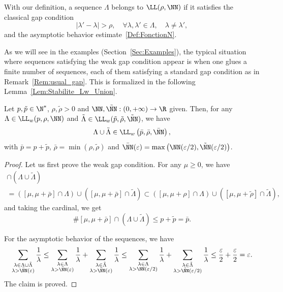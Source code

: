 \begin{rema}\label{Rem:usual_gap}
With our definition, a sequence $\Lambda$ belongs to $\LL(\rho,\NN)$ if it satisfies the classical gap condition
\begin{equation}\label{FattoriniRussell_Gap}
|\lambda' - \lambda| > \rho, \quad \forall \lambda,\lambda'\in \Lambda, \quad \lambda\neq \lambda',
\end{equation}
and the asymptotic behavior estimate~\eqref{Def:FonctionN}.
\end{rema}

As we will see in the examples (Section~\ref{Sec:Examples}), the typical situation where sequences satisfying the weak gap condition appear is when one glues a finite number of sequences, each of them satisfying a standard gap condition as in Remark~\ref{Rem:usual_gap}. This is formalized in the following Lemma~\ref{Lem:Stabilite_Lw_Union}.


\begin{lemm}\label{Lem:Stabilite_Lw_Union}
Let $p,\tilde{p} \in \N^*$, $\rho,\tilde{\rho} > 0$ and $\NN,\tilde{\NN} : (0,+\infty) \to \R$ given. Then, for any $\Lambda\in \LL_w(p, \rho, \NN)$ and $\tilde{\Lambda}\in \LL_w(\tilde{p}, \tilde{\rho}, \tilde{\NN})$, we have
\[
\Lambda \cup \tilde{\Lambda} \in \LL_w\left(\bar{p}, \bar{\rho}, \bar{\NN}\right),
\]
with $\bar{p}=p+\tilde{p}$, $\bar{\rho}=\min(\rho,\tilde{\rho})$ and $\bar{\NN}(\varepsilon) = \max \left(\NN(\varepsilon/2),\tilde{\NN}(\varepsilon/2)\right)$.
\end{lemm}

\begin{proof}
Let us first prove the weak gap condition. For any $\mu\geq 0$, we have
\begin{multline*}
[\mu,\mu+\bar{\rho}] \cap \left(\Lambda\cup \tilde{\Lambda}\right)\\ = \left([\mu,\mu+\bar{\rho}] \cap \Lambda \right) \cup \left([\mu,\mu+\bar{\rho}]\cap \tilde{\Lambda}\right)
\subset \left([\mu,\mu+\rho] \cap \Lambda \right) \cup \left([\mu,\mu+\tilde{\rho}]\cap \tilde{\Lambda}\right),
\end{multline*}
and taking the cardinal, we get
\[
\# [\mu,\mu+\bar{\rho}] \cap \left(\Lambda\cup \tilde{\Lambda}\right) \leq p + \tilde{p}=\bar{p}.
\]

For the asymptotic behavior of the sequences, we have
\[
\sum_{\substack{\lambda \in \Lambda\cup \tilde{\Lambda} \\ \lambda>\bar{\NN}(\varepsilon)}} \frac{1}{\lambda}
\leq \sum_{\substack{\lambda \in \Lambda \\ \lambda>\bar{\NN}(\varepsilon)}} \frac{1}{\lambda} + \sum_{\substack{\lambda \in \tilde{\Lambda} \\ \lambda>\bar{\NN}(\varepsilon)}} \frac{1}{\lambda}
\leq \sum_{\substack{\lambda \in \Lambda \\ \lambda>{\NN}(\varepsilon/2)}} \frac{1}{\lambda} + \sum_{\substack{\lambda \in \tilde{\Lambda} \\ \lambda>\tilde{\NN}(\varepsilon/2)}} \frac{1}{\lambda}
\leq \frac{\varepsilon}{2} + \frac{\varepsilon}{2} = \varepsilon.
\]
The claim is proved.
\end{proof}



